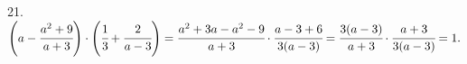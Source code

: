 21. $\left(a-\cfrac{a^2+9}{a+3}\right)\cdot \left(\cfrac{1}{3}+\cfrac{2}{a-3}\right)=
\cfrac{a^2+3a-a^2-9}{a+3}\cdot\cfrac{a-3+6}{3(a-3)}=\cfrac{3(a-3)}{a+3}\cdot\cfrac{a+3}{3(a-3)}=1.$\\
